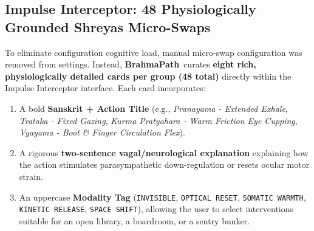 \documentclass[11pt,a4paper]{article}
\newcommand{\AppName}{\textbf{BrahmaPath}}
\begin{document}
\subsection{Impulse Interceptor: 48 Physiologically Grounded Shreyas Micro-Swaps}
To eliminate configuration cognitive load, manual micro-swap configuration was removed from settings. Instead, \AppName\ curates \textbf{eight rich, physiologically detailed cards per group (48 total)} directly within the Impulse Interceptor interface. Each card incorporates:
\begin{enumerate}
    \item A bold \textbf{Sanskrit + Action Title} (e.g., \textit{Pranayama - Extended Exhale}, \textit{Trataka - Fixed Gazing}, \textit{Kurma Pratyahara - Warm Friction Eye Cupping}, \textit{Vyayama - Boot \& Finger Circulation Flex}).
    \item A rigorous \textbf{two-sentence vagal/neurological explanation} explaining how the action stimulates parasympathetic down-regulation or resets ocular motor strain.
    \item An uppercase \textbf{Modality Tag} (\texttt{INVISIBLE}, \texttt{OPTICAL RESET}, \texttt{SOMATIC WARMTH}, \texttt{KINETIC RELEASE}, \texttt{SPACE SHIFT}), allowing the user to select interventions suitable for an open library, a boardroom, or a sentry bunker.
\end{enumerate}
\end{document}
